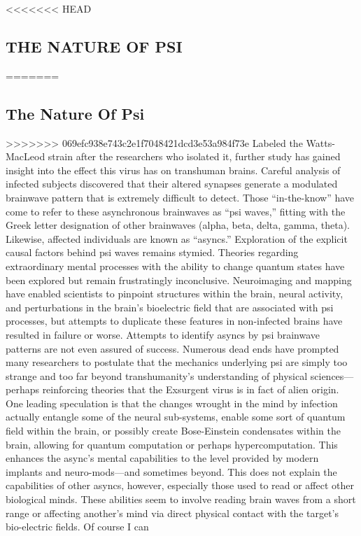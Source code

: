 <<<<<<< HEAD
\subsection{THE NATURE OF PSI}
=======
\subsection{The Nature Of Psi}
>>>>>>> 069efc938e743c2e1f7048421dcd3e53a984f73e
Labeled the Watts-MacLeod strain
after the researchers who isolated it,
further study has gained insight into
the effect this virus has on transhuman
brains. Careful analysis of infected
subjects discovered that their altered
synapses generate a modulated brainwave
pattern that is extremely difficult
to detect. Those “in-the-know” have
come to refer to these asynchronous
brainwaves as “psi waves,” fitting with
the Greek letter designation of other
brainwaves (alpha, beta, delta, gamma,
theta). Likewise, affected individuals are
known as “asyncs.”
Exploration of the explicit causal factors
behind psi waves remains stymied.
Theories regarding extraordinary mental
processes with the ability to change
quantum states have been explored but
remain frustratingly inconclusive. Neuroimaging
and mapping have enabled
scientists to pinpoint structures within
the brain, neural activity, and perturbations
in the brain’s bioelectric field that
are associated with psi processes, but
attempts to duplicate these features
in non-infected brains have resulted in
failure or worse. Attempts to identify
asyncs by psi brainwave patterns are not
even assured of success. Numerous dead
ends have prompted many researchers to
postulate that the mechanics underlying
psi are simply too strange and too far
beyond transhumanity’s understanding
of physical sciences—perhaps reinforcing
theories that the Exsurgent virus is in
fact of alien origin.
One leading speculation is that the
changes wrought in the mind by infection
actually entangle some of the
neural sub-systems, enable some sort of
quantum field within the brain, or possibly
create Bose-Einstein condensates
within the brain, allowing for quantum
computation or perhaps hypercomputation.
This enhances the async’s mental
capabilities to the level provided by
modern implants and neuro-mods—and
sometimes beyond. This does not explain
the capabilities of other asyncs, however,
especially those used to read or affect
other biological minds. These abilities
seem to involve reading brain waves
from a short range or affecting another’s
mind via direct physical contact with the
target’s bio-electric fields. Of course I can
